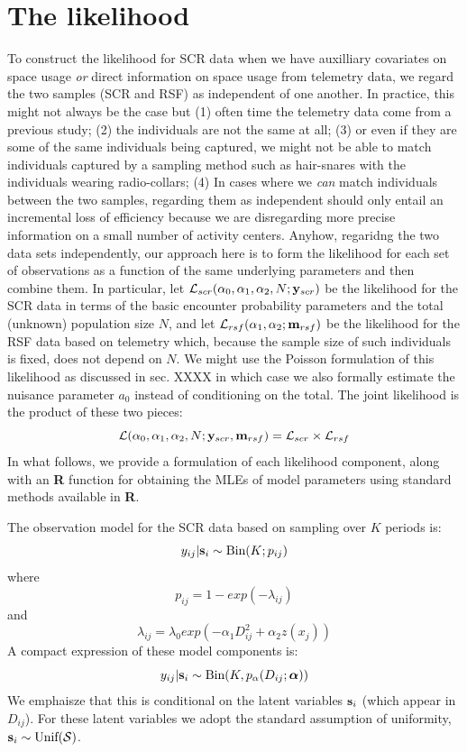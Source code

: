 \section{The likelihood}

To construct the likelihood for SCR data when we have auxilliary
covariates on space usage {\it or} direct information on space usage
from telemetry data, we regard the two samples (SCR and RSF) as
independent of one another. In practice, this might not always be the
case but (1) often time the telemetry data come from a previous study;
(2) the individuals are not the same at all; (3) or even if they are
some of the same individuals being captured, we might not be able to
match individuals captured by a sampling method such as hair-snares
with the individuals wearing radio-collars; (4) In cases where we {\it
  can} match individuals between the two samples, regarding them as
independent should only entail an incremental loss of efficiency
because we are disregarding more precise information on a small number
of activity centers.
Anyhow, regaridng the two data sets independently, our approach here
is to form the likelihood for each set of observations as a function
of the same underlying parameters and then combine them. In
particular, let ${\cal L}_{scr}(\alpha_{0}, \alpha_{1}, \alpha_{2}, N;
{\bf y}_{scr})$
be the likelihood for the SCR data in terms of the basic encounter
probability parameters and the total (unknown) population size $N$,
and let ${\cal L}_{rsf}(\alpha_{1},\alpha_{2}; {\bf m}_{rsf})$ be the
likelihood for the RSF data based on telemetry which, because the
sample size of such individuals is fixed, does not depend on $N$. We
might use the Poisson formulation of this likelihood as discussed in
sec. XXXX in which case 
we also formally estimate the nuisance parameter $a_{0}$ instead of
conditioning on the total. 
The
joint likelihood is the product of these two pieces:
\[
{\cal L}(\alpha_{0},\alpha_{1},\alpha_{2},N; {\bf y}_{scr},{\bf
  m}_{rsf})  = {\cal L}_{scr} \times {\cal L}_{rsf}
\]
In what follows, we provide a formulation of each likelihood
component, along with an {\bf R} function for obtaining the MLEs of
model parameters using standard methods available in {\bf R}. 

The observation model for the SCR data based on 
sampling over $K$ periods  is:
\[
 y_{ij}|{\bf s}_{i} \sim \mbox{Bin}(K; p_{ij})
\]
where 
\[
 p_{ij} = 1-exp(- \lambda_{ij} )
\]
and
\[
 \lambda_{ij} = \lambda_{0} exp(- \alpha_{1} D_{ij}^{2} + \alpha_{2}  z(x_{j}) )
\]
 A compact expression of these
model components is:
\begin{equation}
y_{ij}| {\bf s}_{i} \sim \mbox{Bin}(K, p_{\alpha}(D_{ij}; {\bm \alpha}))
\label{rsf.mle.eq.cond-on-s}
\end{equation}
We emphaisze that this is conditional on the latent variables ${\bf
  s}_{i}$ (which appear in $D_{ij}$). For these latent variables we
adopt the standard assumption of uniformity,
${\bf s}_{i} \sim  \mbox{Unif}({\cal  S})$.

